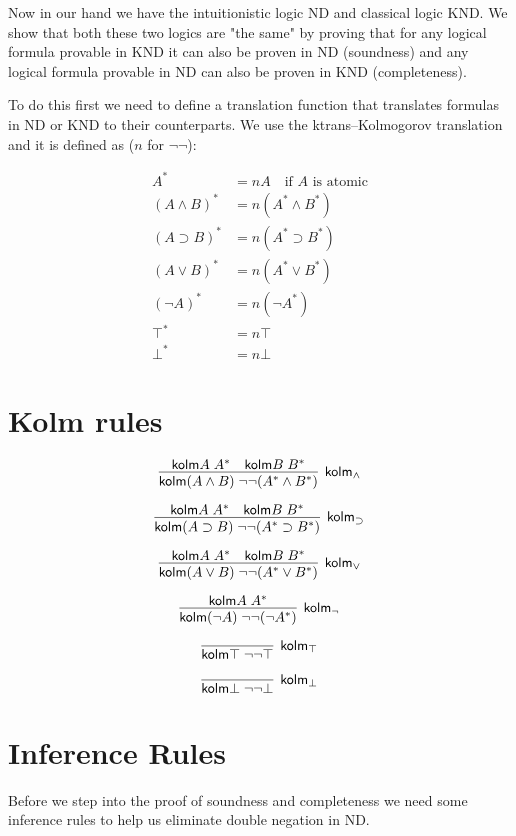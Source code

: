 \documentclass{article}
\begin{document}
Now in our hand we have the intuitionistic logic ND
 and classical logic KND. We show that both these two
  logics are "the same" by proving that for any logical formula provable in KND it can also be proven in ND (soundness) and any logical formula provable in ND can also be proven in KND (completeness).

To do this first we need to define a translation function that translates formulas in ND or KND to their counterparts. We use the ktrans--Kolmogorov translation and it is defined as ($n$ for $\neg\neg$):

\begin{align*}
A^* &= nA \quad \text{if } A \text{ is atomic} \\
(A \land B)^* &= n(A^* \land B^*) \\
(A \supset B)^* &= n(A^* \supset B^*) \\
(A \lor B)^* &= n(A^* \lor B^*) \\
(\neg A)^* &= n(\neg A^*) \\
\top^* &= n\top \\
\bot^* &= n\bot
\end{align*}


\section{Kolm rules}

\newcommand{\kolm}{\mathsf{kolm}}   %
\newcommand{\nneg}{\neg\neg}        %

\[
\infer[\kolm_{\land}]
  {\kolm (A \land B)\; \nneg (A^{*} \land B^{*})}
  {
    \kolm A\; A^{*}
    &
    \kolm B\; B^{*}
  }
\]

\[
\infer[\kolm_{\supset}]
  {\kolm (A \supset B)\; \nneg (A^{*} \supset B^{*})}
  {
    \kolm A\; A^{*}
    &
    \kolm B\; B^{*}
  }
\]

\[
\infer[\kolm_{\lor}]
  {\kolm (A \lor B)\; \nneg (A^{*} \lor B^{*})}
  {
    \kolm A\; A^{*}
    &
    \kolm B\; B^{*}
  }
\]

\[
\infer[\kolm_{\neg}]
  {\kolm (\neg A)\; \nneg (\neg A^{*})}
  {
    \kolm A\; A^{*}
  }
\]

\[
\infer[\kolm_{\top}]
  {\kolm \top\; \nneg \top}
  {}
\]

\[
\infer[\kolm_{\bot}]
  {\kolm \bot\; \nneg \bot}
  {}
\]

\section{Inference Rules}
Before we step into the proof of soundness and completeness we need some 
inference rules to help us eliminate double negation in ND.
\end{document}
